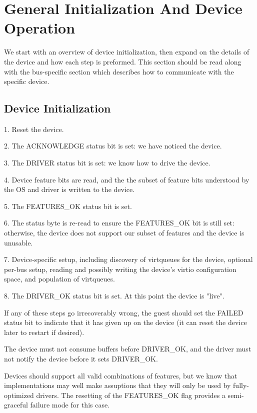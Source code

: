 \chapter{General Initialization And Device Operation}\label{sec:General Initialization And Device Operation}

We start with an overview of device initialization, then expand on the
details of the device and how each step is preformed.  This section
should be read along with the bus-specific section which describes
how to communicate with the specific device.

\section{Device Initialization}\label{sec:General Initialization And Device Operation / Device Initialization}

1. Reset the device.

2. The ACKNOWLEDGE status bit is set: we have noticed the device.

3. The DRIVER status bit is set: we know how to drive the device.

4. Device feature bits are read, and the the subset of feature bits
   understood by the OS and driver is written to the device.

5. The FEATURES_OK status bit is set.

6. The status byte is re-read to ensure the FEATURES_OK bit is still
   set: otherwise, the device does not support our subset of features
   and the device is unusable.

7. Device-specific setup, including discovery of virtqueues for the
   device, optional per-bus setup, reading and possibly writing the
   device's virtio configuration space, and population of virtqueues.

8. The DRIVER_OK status bit is set.  At this point the device is
   "live".

If any of these steps go irrecoverably wrong, the guest should
set the FAILED status bit to indicate that it has given up on the
device (it can reset the device later to restart if desired).

The device must not consume buffers before DRIVER_OK, and the driver
must not notify the device before it sets DRIVER_OK.

Devices should support all valid combinations of features, but we know
that implementations may well make assuptions that they will only be
used by fully-optimized drivers.  The resetting of the FEATURES_OK flag
provides a semi-graceful failure mode for this case.

